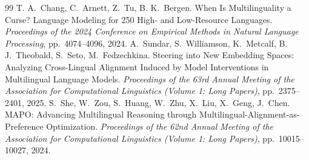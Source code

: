 \documentclass[11pt,a4paper]{article}
\begin{document}
\begin{thebibliography}{99}
T. A.~Chang, C.~Arnett, Z.~Tu, B. K.~Bergen. When Is Multilinguality a Curse? Language Modeling for 250 High- and Low-Resource Languages. \emph{Proceedings of the 2024 Conference on Empirical Methods in Natural Language Processing}, pp.~4074--4096, 2024.
A.~Sundar, S.~Williamson, K.~Metcalf, B. J.~Theobald, S.~Seto, M.~Fedzechkina. Steering into New Embedding Spaces: Analyzing Cross-Lingual Alignment Induced by Model Interventions in Multilingual Language Models. \emph{Proceedings of the 63rd Annual Meeting of the Association for Computational Linguistics (Volume 1: Long Papers)}, pp.~2375--2401, 2025.
S.~She, W.~Zou, S.~Huang, W.~Zhu, X.~Liu, X.~Geng, J.~Chen. MAPO: Advancing Multilingual Reasoning through Multilingual-Alignment-as-Preference Optimization. \emph{Proceedings of the 62nd Annual Meeting of the Association for Computational Linguistics (Volume 1: Long Papers)}, pp.~10015--10027, 2024.
\end{thebibliography}
\end{document}
